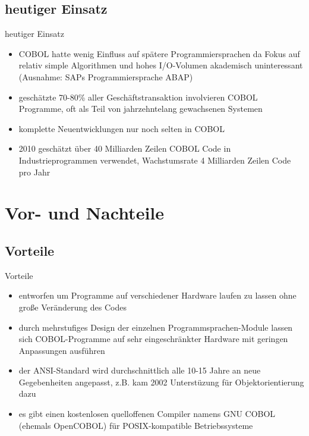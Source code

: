\documentclass[handout]{beamer}
\begin{document}
\subsection{heutiger Einsatz}
\begin{frame}{heutiger Einsatz}
	\begin{itemize}[<+->]
		\item
			COBOL hatte wenig Einfluss auf sp\"atere Programmiersprachen da Fokus auf relativ simple Algorithmen und hohes I/O-Volumen akademisch uninteressant (Ausnahme: SAPs Programmiersprache ABAP)
		\item
			geschätzte 70-80\% aller Geschäftstransaktion involvieren COBOL Programme, oft als Teil von jahrzehntelang gewachsenen Systemen
		\item
			komplette Neuentwicklungen nur noch selten in COBOL
		\item
			2010 geschätzt \"uber 40 Milliarden Zeilen COBOL Code in Industrieprogrammen verwendet, Wachstumsrate 4 Milliarden Zeilen Code pro Jahr
	\end{itemize}
\end{frame}


\section{Vor- und Nachteile}
\subsection{Vorteile}
\begin{frame}{Vorteile}
	\begin{itemize}[<+->]
		\item
			entworfen um Programme auf verschiedener Hardware laufen zu lassen ohne große Ver\"anderung des Codes
		\item
			durch mehrstufiges Design der einzelnen Programmsprachen-Module lassen sich COBOL-Programme auf sehr eingeschr\"ankter Hardware mit geringen Anpassungen ausf\"uhren
		\item
			der ANSI-Standard wird durchschnittlich alle 10-15 Jahre an neue Gegebenheiten angepasst, z.B. kam 2002 Unterstüzung für Objektorientierung dazu
		\item
			es gibt einen kostenlosen quelloffenen Compiler namens GNU COBOL (ehemals OpenCOBOL) für POSIX-kompatible Betriebssysteme
	\end{itemize}
\end{frame}
\end{document}
